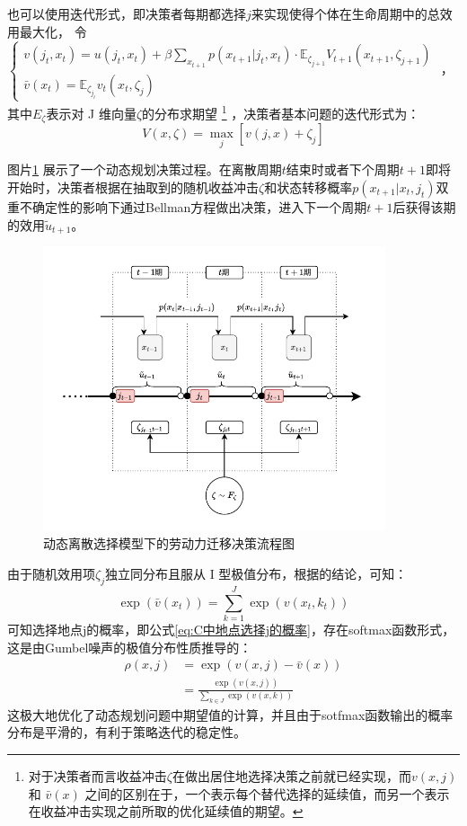 \documentclass[a4paper, zihao=-4, fontset = mac, oneside]{ctexbook} %
\let\oldfootnote\footnote
\renewcommand{\footnote}[1]{%
  \oldfootnote{\setstretch{1.5}#1}%
}
\begin{document}
也可以使用迭代形式，即决策者每期都选择$j$来实现使得个体在生命周期中的总效用最大化，
令
$\begin{cases}
  v(j_{t},x_{t})=u(j_{t} ,x_{t})+\beta \sum_{x_{t+1}} p(x_{t+1}|j_t,x_t) \cdot \mathbb{E}_{\zeta_{j+1}} V_{t+1}(x_{t+1},\zeta_{j+1})
  \\
  \bar v(x_{t})=\mathbb{E}_{\zeta_{j_t}} v_{t}(x_{t},\zeta_{j})
\end{cases}$
，其中$E_{\zeta}$表示对 J 维向量$\zeta$的分布求期望\footnote{对于决策者而言收益冲击$\zeta$在做出居住地选择决策之前就已经实现，而$v(x,j)$ 和 $\bar v(x)$ 之间的区别在于，一个表示每个替代选择的延续值，而另一个表示在收益冲击实现之前所取的优化延续值的期望。}，决策者基本问题的迭代形式为：
\begin{equation}
V(x,\zeta)=\max\limits_{j}[v(j,x)+\zeta_{j}]
\end{equation}

图片\ref{fig:migration_flow_resized2} 展示了一个动态规划决策过程。在离散周期$t$结束时或者下个周期$t+1$即将开始时，决策者根据在抽取到的随机收益冲击$\zeta$和状态转移概率$p(x_{t+1}|x_t,j_t)$双重不确定性的影响下通过Bellman方程做出决策，进入下一个周期$t+1$后获得该期的效用$\tilde u_{t+1}$。

\begin{figure}[!ht]
\centering
\caption{动态离散选择模型下的劳动力迁移决策流程图}
\label{fig:migration_flow_resized2}
\includegraphics[width=0.9\textwidth]{images/dynamicsequence2.drawio.pdf}
\end{figure}

由于随机效用项$\zeta_j$独立同分布且服从 I 型极值分布，根据\textcite{mcfaddenConditionalLogitAnalysis1973,rustOptimalReplacementGMC1987,rustStructuralEstimationMarkov1994}的结论，可知：
\begin{equation}
  \exp(\bar v(x_t))=\sum\limits_{k=1}^{J}\exp(v(x_t,k_t))
\end{equation}
可知选择地点j的概率，即公式\ref{eq:C中地点选择j的概率}，存在softmax函数形式，这是由Gumbel噪声的极值分布性质推导的：
\begin{align}
\rho(x,j)&=\exp(v(x,j)-\bar v(x))
\\&=\frac{\exp(v(x,j))}{\sum\limits_{k\in J} \exp(v(x,k))} \label{eq:地点选择概率}
\end{align}
这极大地优化了动态规划问题中期望值的计算，并且由于sotfmax函数输出的概率分布是平滑的，有利于策略迭代的稳定性。
\end{document}
